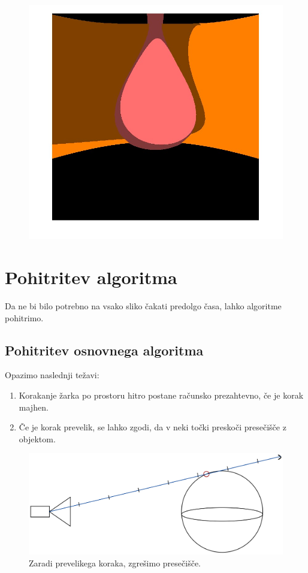 \documentclass[titlepage]{article}
\begin{document}
\begin{figure}[H]
\begin{minipage}[t]{.33\textwidth}
  \label{fig:Flat torus render}
\end{minipage}
\begin{minipage}[t]{.33\textwidth}
  \centering
  \includegraphics[width=1\linewidth]{Images/2Sphere.jpg}
  \label{fig:2Sphere render}
\end{minipage}
\end{figure}


\newpage
\section{Pohitritev algoritma}
Da ne bi bilo potrebno na vsako sliko čakati predolgo časa, lahko algoritme pohitrimo. 

\subsection{Pohitritev osnovnega algoritma}
Opazimo naslednji težavi: 
\begin{enumerate}
  \item Korakanje žarka po prostoru hitro postane računsko prezahtevno, če je korak majhen.
  \item Če je korak prevelik, se lahko zgodi, da v neki točki preskoči presečišče z objektom.
\end{enumerate}

\begin{figure} [H]
  \centering
  \includegraphics[width=0.6\linewidth]{Images/step_size_issue.png}
  \caption{Zaradi prevelikega koraka, zgrešimo presečišče.}
  \label{fig:step_size_issue}
\end{figure}
\end{document}
